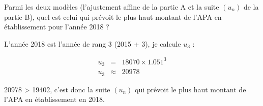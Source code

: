 \begin{questions}
	\question Parmi les deux modèles (l'ajustement affine de la partie A et la suite $(u_n)$ de la partie B), quel est celui qui prévoit le plus haut montant de l'APA en établissement pour l'année 2018 ?
	
	\begin{solution}
		L'année 2018 est l'année de rang 3 (2015 + 3), je calcule $u_3$ :
		
		\begin{eqnarray*}
			u_3 &=& \num{18070} \times \num{1.051}^3 \\
			u_3 & \approx & \num{20978}
		\end{eqnarray*}
	
		\num{20978} > \num{19402}, c'est donc la suite $(u_n)$ qui prévoit le plus haut montant de l'APA en établissement en 2018.
	\end{solution}
\end{questions}